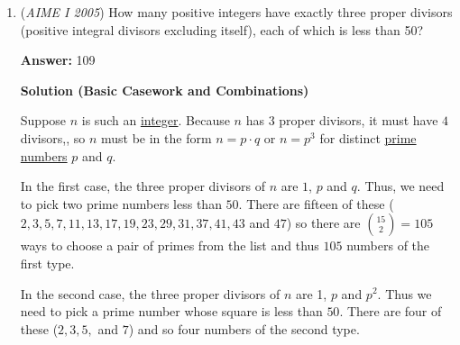 \begin{enumerate}
 Alternatively, notice that the formula for the number of \href{https://artofproblemsolving.com/wiki/index.php?title=Divisor}{divisors} states that there are $(2 + 1)(1 + 1)(1 + 1) = 12$ divisors of $2^2\cdot 3^1\cdot 167^1$.

 



\textbf{Solution 2}

Any term in the sequence $S_k$ can be written as 1+kx.  If this is to equal 2005, then the remainder when 2005 is divided by k is 1.

 Now all we have to do is find the numbers of factors of 2004.  There are $(2 + 1)(1 + 1)(1 + 1) = \boxed{012}$ divisors of $2^2\cdot 3^1\cdot 167^1$.

 Note that although the remainder when 2005 divided by 1 is not 1, it still works- $S_1$ would be the sequence of all positive integers, in which 2005 must appear.

 Note: the problem where this is linked is covered 1:45-2:40

 


	\item (\textit{AIME I 2005}) How many positive integers have exactly three proper divisors (positive integral divisors excluding itself), each of which is less than 50?


 
 \textbf{Answer: }109



\textbf{Solution (Basic Casework and Combinations)}

Suppose $n$ is such an \href{https://artofproblemsolving.com/wiki/index.php?title=Integer}{integer}. Because $n$ has $3$ proper divisors, it must have $4$ divisors,, so $n$ must be in the form $n=p\cdot q$ or $n=p^3$ for distinct \href{https://artofproblemsolving.com/wiki/index.php?title=Prime\_number}{prime numbers} $p$ and $q$. 

 In the first case, the three proper divisors of $n$ are $1$, $p$ and $q$.  Thus, we need to pick two prime numbers less than $50$. There are fifteen of these ($2, 3, 5, 7, 11, 13, 17, 19, 23, 29, 31, 37, 41, 43$ and $47$) so there are ${15 \choose 2} =105$ ways to choose a pair of primes from the list and thus $105$ numbers of the first type.

 In the second case, the three proper divisors of $n$ are 1, $p$ and $p^2$.  Thus we need to pick a prime number whose square is less than $50$.  There are four of these ($2, 3, 5,$ and $7$) and so four numbers of the second type. 


\end{enumerate}
